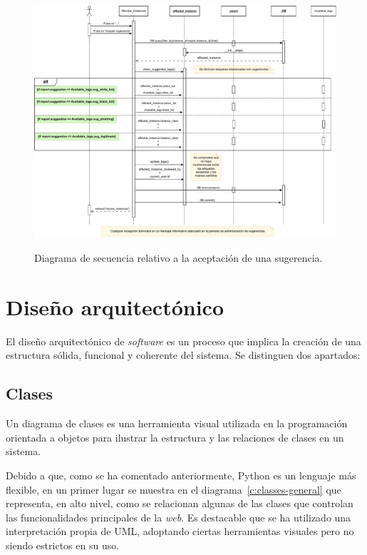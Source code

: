 	\begin{landscape}
		\begin{figure}[h]
			\caption[Diagrama: secuencia (aceptar sugerencia)]{Diagrama de secuencia relativo a la aceptación de una sugerencia.}
			\centering
			\includegraphics[scale=0.55]{../img/anexos/diagrams/sequence-accept_review}
			\label{c:diagrama-seq-accept-review}
		\end{figure}
	\end{landscape}

\section{Diseño arquitectónico}
\label{s:diseño-arquitectonico}

El diseño arquitectónico de \textit{software} es un proceso que implica la creación de una estructura sólida, funcional y coherente del sistema. Se distinguen dos apartados:

\subsection{Clases}

Un diagrama de clases es una herramienta visual utilizada en la programación orientada a objetos para ilustrar la estructura y las relaciones de clases en un sistema.

Debido a que, como se ha comentado anteriormente, Python es un lenguaje más flexible, en un primer lugar se muestra en el diagrama~\ref{c:classes-general} que representa, en alto nivel, como se relacionan algunas de las clases que controlan las funcionalidades principales de la \textit{web}. Es destacable que se ha utilizado una interpretación propia de UML, adoptando ciertas herramientas visuales pero no siendo estrictos en su uso.

